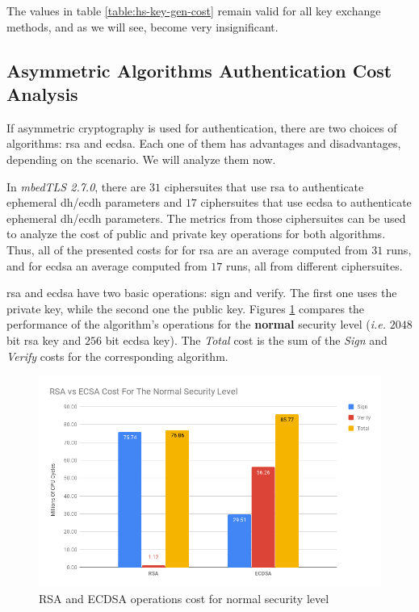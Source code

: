 \documentclass{llncs}
\begin{document}
The values in table \ref{table:hs-key-gen-cost} remain valid for all key exchange methods, and as we will see,
become very insignificant.

\subsection{Asymmetric Algorithms Authentication Cost Analysis} \label{sec:asym-algs-analysis}

If asymmetric cryptography is used for authentication, there are two
choices of algorithms: \gls{rsa} and \gls{ecdsa}. Each one of them has advantages and disadvantages, depending on the
scenario. We will analyze them now.

In \textit{mbedTLS 2.7.0}, there are $31$ ciphersuites that use \gls{rsa} to authenticate ephemeral \gls{dh}/\gls{ecdh} parameters
and $17$ ciphersuites that use \gls{ecdsa} to authenticate ephemeral \gls{dh}/\gls{ecdh} parameters. The metrics from those
ciphersuites can be used to analyze the cost of public and private key operations for both algorithms. Thus, all of the presented
costs for for \gls{rsa} are an average computed from $31$ runs, and for \gls{ecdsa} an average computed from $17$ runs, all from
different ciphersuites.

\gls{rsa} and \gls{ecdsa} have two basic operations: sign and verify. The first one uses the private key, while the
second one the public key. Figures \ref{fig:rsa-ecdsa-sign-ver-total-normal-sl} compares the performance of the algorithm's
operations for the \textbf{normal} security level (\textit{i.e.} $2048$ bit \gls{rsa} key and $256$ bit \gls{ecdsa} key).
The \textit{Total} cost is the sum of the \textit{Sign} and \textit{Verify} costs for the corresponding algorithm.

\begin{figure}
  \centering
  \includegraphics[width=1.0\textwidth]{img/rsa_ecdsa_cost_normal_sl.png}
  \centering \caption{\label{fig:rsa-ecdsa-sign-ver-total-normal-sl} RSA and ECDSA operations cost for normal security level}
\end{figure}
\end{document}
